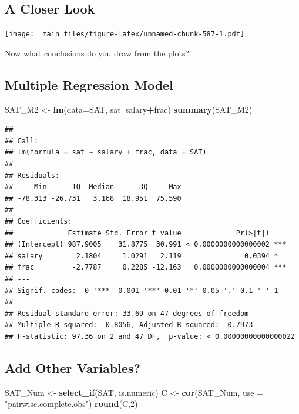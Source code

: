 \documentclass[]{book}
\newenvironment{Shaded}{\begin{snugshade}}{\end{snugshade}}
\newcommand{\KeywordTok}[1]{\textcolor[rgb]{0.13,0.29,0.53}{\textbf{#1}}}
\newcommand{\DataTypeTok}[1]{\textcolor[rgb]{0.13,0.29,0.53}{#1}}
\newcommand{\DecValTok}[1]{\textcolor[rgb]{0.00,0.00,0.81}{#1}}
\newcommand{\StringTok}[1]{\textcolor[rgb]{0.31,0.60,0.02}{#1}}
\newcommand{\OperatorTok}[1]{\textcolor[rgb]{0.81,0.36,0.00}{\textbf{#1}}}
\newcommand{\NormalTok}[1]{#1}
\begin{document}
\subsection{A Closer Look}\label{a-closer-look-1}

\texttt{[image: \_main\_files/figure-latex/unnamed-chunk-587-1.pdf]}

Now what conclusions do you draw from the plots?

\subsection{Multiple Regression
Model}\label{multiple-regression-model-2}

\begin{Shaded}
\begin{Highlighting}[]
\NormalTok{SAT_M2 <-}\StringTok{ }\KeywordTok{lm}\NormalTok{(}\DataTypeTok{data=}\NormalTok{SAT, sat}\OperatorTok{~}\NormalTok{salary}\OperatorTok{+}\NormalTok{frac)}
\KeywordTok{summary}\NormalTok{(SAT_M2)}
\end{Highlighting}
\end{Shaded}

\begin{verbatim}
## 
## Call:
## lm(formula = sat ~ salary + frac, data = SAT)
## 
## Residuals:
##     Min      1Q  Median      3Q     Max 
## -78.313 -26.731   3.168  18.951  75.590 
## 
## Coefficients:
##             Estimate Std. Error t value             Pr(>|t|)    
## (Intercept) 987.9005    31.8775  30.991 < 0.0000000000000002 ***
## salary        2.1804     1.0291   2.119               0.0394 *  
## frac         -2.7787     0.2285 -12.163   0.0000000000000004 ***
## ---
## Signif. codes:  0 '***' 0.001 '**' 0.01 '*' 0.05 '.' 0.1 ' ' 1
## 
## Residual standard error: 33.69 on 47 degrees of freedom
## Multiple R-squared:  0.8056, Adjusted R-squared:  0.7973 
## F-statistic: 97.36 on 2 and 47 DF,  p-value: < 0.00000000000000022
\end{verbatim}

\subsection{Add Other Variables?}\label{add-other-variables}

\begin{Shaded}
\begin{Highlighting}[]
\NormalTok{SAT_Num <-}\StringTok{ }\KeywordTok{select_if}\NormalTok{(SAT, is.numeric)}
\NormalTok{C <-}\StringTok{ }\KeywordTok{cor}\NormalTok{(SAT_Num, }\DataTypeTok{use =} \StringTok{"pairwise.complete.obs"}\NormalTok{)}
\KeywordTok{round}\NormalTok{(C,}\DecValTok{2}\NormalTok{)}
\end{Highlighting}
\end{Shaded}
\end{document}
